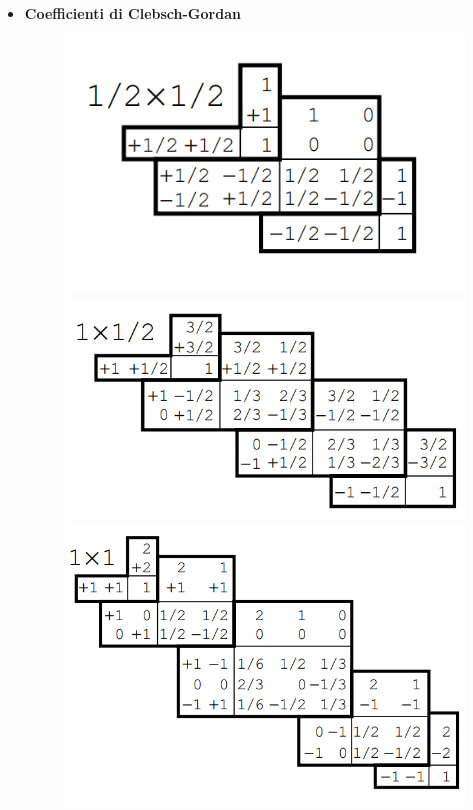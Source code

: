 \documentclass{article}
\begin{document}
\begin{footnotesize}
\begin{multicols*}{3}
\begin{itemize}[leftmargin=*]
	\item \textbf{Coefficienti di Clebsch-Gordan}
		\begin{figure}[H]
			\includegraphics[width=.44\linewidth]{cg_12_12.png}
			\includegraphics[width=.54\linewidth]{cg_1_12.png}
			\includegraphics[width=1\linewidth]{cg_1_1.png}
		\end{figure}
\end{itemize}
\end{multicols*}
\end{footnotesize}
\end{document}
